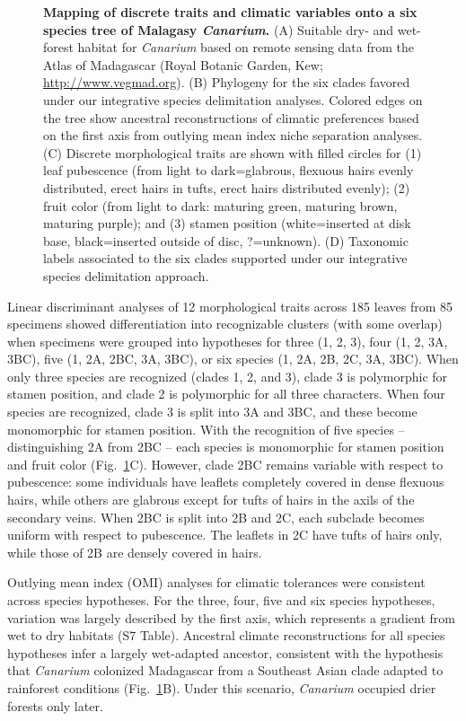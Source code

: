 \documentclass[10pt,letterpaper]{article}
\begin{document}
\begin{figure}[!h]
  \caption{{\bf Mapping of discrete traits and climatic variables onto a six species tree of Malagasy \emph{Canarium}.}
    (A) Suitable dry- and wet-forest habitat for \emph{Canarium} based on remote sensing data from the Atlas of Madagascar (Royal Botanic Garden, Kew; \url{http://www.vegmad.org}). (B) Phylogeny for the six clades favored under our integrative species delimitation analyses. Colored edges on the tree show ancestral reconstructions of climatic preferences based on the first axis from outlying mean index niche separation analyses. (C) Discrete morphological traits are shown with filled circles for (1) leaf pubescence (from light to dark=glabrous, flexuous hairs evenly distributed, erect hairs in tufts, erect hairs distributed evenly); (2) fruit color (from light to dark: maturing green, maturing brown, maturing purple); and (3) stamen position (white=inserted at disk base, black=inserted outside of disc, ?=unknown). (D) Taxonomic labels associated to the six clades supported under our integrative species delimitation approach.}
  \label{fig:fig4}
\end{figure}



Linear discriminant analyses of 12 morphological traits across 185 leaves from 85 specimens showed differentiation into recognizable clusters (with some overlap) when specimens were grouped into hypotheses for three (1, 2, 3), four (1, 2, 3A, 3BC), five (1, 2A, 2BC, 3A, 3BC), or six species (1, 2A, 2B, 2C, 3A, 3BC). When only three species are recognized (clades 1, 2, and 3), clade 3 is polymorphic for stamen position, and clade 2 is polymorphic for all three characters. When four species are recognized, clade 3 is split into 3A and 3BC, and these become monomorphic for stamen position. With the recognition of five species – distinguishing 2A from 2BC – each species is monomorphic for stamen position and fruit color (Fig.~\ref{fig:fig4}C). However, clade 2BC remains variable with respect to pubescence: some individuals have leaflets completely covered in dense flexuous hairs, while others are glabrous except for tufts of hairs in the axils of the secondary veins. When 2BC is split into 2B and 2C, each subclade becomes uniform with respect to pubescence. The leaflets in 2C have tufts of hairs only, while those of 2B are densely covered in hairs.

Outlying mean index (OMI) analyses for climatic tolerances were consistent across species hypotheses. For the three, four, five and six species hypotheses, variation was largely described by the first axis, which represents a gradient from wet to dry habitats (S7 Table). %
Ancestral climate reconstructions for all species hypotheses infer a largely wet-adapted ancestor, consistent with the hypothesis that \emph{Canarium} colonized Madagascar from a Southeast Asian clade adapted to rainforest conditions (Fig.~\ref{fig:fig4}B). Under this scenario, \emph{Canarium} occupied drier forests only later.  
\end{document}
